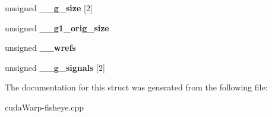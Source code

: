 \begin{DoxyCompactItemize}
\item 
unsigned {\bfseries \+\_\+\+\_\+g\+\_\+size} \mbox{[}2\mbox{]}\hypertarget{struct____pthread__cond__s_a9a380cd6f5e4e11801fb69a48869fc85}{}\label{struct____pthread__cond__s_a9a380cd6f5e4e11801fb69a48869fc85}

\item 
unsigned {\bfseries \+\_\+\+\_\+g1\+\_\+orig\+\_\+size}\hypertarget{struct____pthread__cond__s_a327472250d2cd5c1628755f2f86703ac}{}\label{struct____pthread__cond__s_a327472250d2cd5c1628755f2f86703ac}

\item 
unsigned {\bfseries \+\_\+\+\_\+wrefs}\hypertarget{struct____pthread__cond__s_a7c9cbaca91d842a2e8400053900874de}{}\label{struct____pthread__cond__s_a7c9cbaca91d842a2e8400053900874de}

\item 
unsigned {\bfseries \+\_\+\+\_\+g\+\_\+signals} \mbox{[}2\mbox{]}\hypertarget{struct____pthread__cond__s_a3c8679e3e01d822d5ba9aee115889f6f}{}\label{struct____pthread__cond__s_a3c8679e3e01d822d5ba9aee115889f6f}

\end{DoxyCompactItemize}


The documentation for this struct was generated from the following file\+:\begin{DoxyCompactItemize}
\item 
cuda\+Warp-\/fisheye.\+cpp\end{DoxyCompactItemize}
